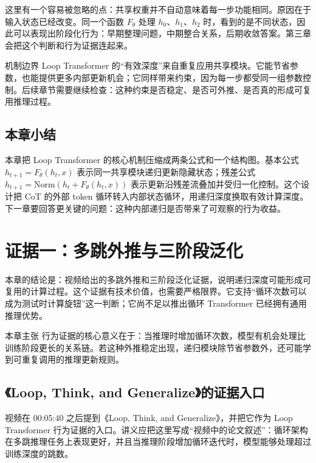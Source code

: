﻿\documentclass[a4paper]{article}
\begin{document}
这里有一个容易被忽略的点：共享权重并不自动意味着每一步功能相同。原因在于输入状态已经改变。同一个函数 \(F_\theta\) 处理 \(h_0\)、\(h_1\)、\(h_2\) 时，看到的是不同状态，因此可以表现出阶段化行为：早期整理问题，中期整合关系，后期收敛答案。第三章会把这个判断和行为证据连起来。

\begin{warningbox}{机制边界}
Loop Transformer 的“有效深度”来自重复应用共享模块。它能节省参数，也能提供更多内部更新机会；它同样带来约束，因为每一步都受同一组参数控制。后续章节需要继续检查：这种约束是否稳定、是否可外推、是否真的形成可复用推理过程。
\end{warningbox}

\subsection{本章小结}

本章把 Loop Transformer 的核心机制压缩成两条公式和一个结构图。基本公式 \(h_{t+1}=F_\theta(h_t,x)\) 表示同一共享模块递归更新隐藏状态；残差公式 \(h_{t+1}=\mathrm{Norm}(h_t+F_\theta(h_t,x))\) 表示更新沿残差流叠加并受归一化控制。这个设计把 CoT 的外部 token 循环转入内部状态循环，用递归深度换取有效计算深度。下一章要回答更关键的问题：这种内部递归是否带来了可观察的行为收益。


\section{证据一：多跳外推与三阶段泛化}
\label{sec:grokking-evidence}

本章的结论是：视频给出的多跳外推和三阶段泛化证据，说明递归深度可能形成可复用的计算过程。这个证据有技术价值，也需要严格限界。它支持“循环次数可以成为测试时计算旋钮”这一判断；它尚不足以推出循环 Transformer 已经拥有通用推理优势。

\begin{importantbox}{本章主张}
行为证据的核心意义在于：当推理时增加循环次数，模型有机会处理比训练阶段更长的关系链。若这种外推稳定出现，递归模块除节省参数外，还可能学到可重复调用的推理更新规则。
\end{importantbox}

\subsection{《Loop, Think, and Generalize》的证据入口}

视频在 00:05:40 之后提到《Loop, Think, and Generalize》，并把它作为 Loop Transformer 行为证据的入口。讲义应把这里写成“视频中的论文叙述”：循环架构在多跳推理任务上表现更好，并且当推理阶段增加循环迭代时，模型能够处理超过训练深度的跳数。
\end{document}
